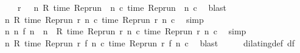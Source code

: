 \begin{isabellebody}
\isanewline
\ \ \ \ {\isacartoucheopen}r\ {\isasymin}\ {\isacharbraceleft}{\isasymrho}{\isachardot}\ {\isasymforall}n{\isachardot}\ R\ {\isacharparenleft}time\ {\isacharparenleft}{\isacharparenleft}Rep{\isacharunderscore}run\ {\isasymrho}{\isacharparenright}\ n\ c\ time\ {\isacharparenleft}{\isacharparenleft}Rep{\isacharunderscore}run\ {\isasymrho}{\isacharparenright}\ n\ c\ \isamarkupfalse%
\ blast\isanewline
\ \ \isamarkupfalse%
\ {\isacartoucheopen}{\isasymforall}n{\isachardot}\ R\ {\isacharparenleft}time\ {\isacharparenleft}{\isacharparenleft}Rep{\isacharunderscore}run\ r{\isacharparenright}\ n\ c\ time\ {\isacharparenleft}{\isacharparenleft}Rep{\isacharunderscore}run\ r{\isacharparenright}\ n\ c\ \isamarkupfalse%
\ simp\isanewline
\ \ \isamarkupfalse%
\ {\isacartoucheopen}{\isasymforall}n{\isachardot}\ {\isacharparenleft}{\isasymexists}n\ f\ n\ {\isacharequal}\ n{\isacharparenright}\ {\isasymlongrightarrow}\ R\ {\isacharparenleft}time\ {\isacharparenleft}{\isacharparenleft}Rep{\isacharunderscore}run\ r{\isacharparenright}\ n\ c\ time\ {\isacharparenleft}{\isacharparenleft}Rep{\isacharunderscore}run\ r{\isacharparenright}\ n\ c\ \isamarkupfalse%
\ simp\isanewline
\ \ \isamarkupfalse%
\ {\isacartoucheopen}{\isasymforall}n\ R\ {\isacharparenleft}time\ {\isacharparenleft}{\isacharparenleft}Rep{\isacharunderscore}run\ r{\isacharparenright}\ {\isacharparenleft}f\ n\ c\ time\ {\isacharparenleft}{\isacharparenleft}Rep{\isacharunderscore}run\ r{\isacharparenright}\ {\isacharparenleft}f\ n\ c\ \isamarkupfalse%
\ blast\isanewline
\ \ \isamarkupfalse%
\ \isamarkupfalse%
\ dilating{\isacharunderscore}def\ df\ \isamarkupfalse%

\end{isabellebody}
